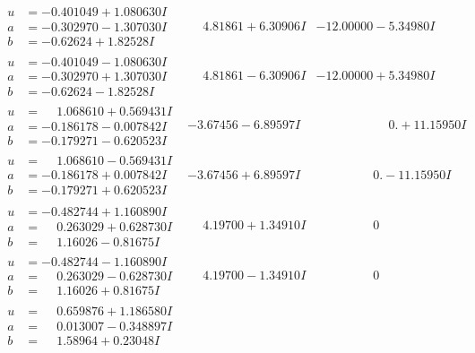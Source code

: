 \documentclass[1p]{elsarticle_modified}
\theoremstyle{definition}
\begin{document}
$$\begin{array}{c|c|c}
\begin{aligned}
u &= -0.401049 + 1.080630 I \\
a &= -0.302970 - 1.307030 I \\
b &= -0.62624 + 1.82528 I\end{aligned}
 & \phantom{-}4.81861 + 6.30906 I & -12.00000 - 5.34980 I \\ \hline\begin{aligned}
u &= -0.401049 - 1.080630 I \\
a &= -0.302970 + 1.307030 I \\
b &= -0.62624 - 1.82528 I\end{aligned}
 & \phantom{-}4.81861 - 6.30906 I & -12.00000 + 5.34980 I \\ \hline\begin{aligned}
u &= \phantom{-}1.068610 + 0.569431 I \\
a &= -0.186178 - 0.007842 I \\
b &= -0.179271 - 0.620523 I\end{aligned}
 & -3.67456 - 6.89597 I & \phantom{-0.000000 -}0. + 11.15950 I \\ \hline\begin{aligned}
u &= \phantom{-}1.068610 - 0.569431 I \\
a &= -0.186178 + 0.007842 I \\
b &= -0.179271 + 0.620523 I\end{aligned}
 & -3.67456 + 6.89597 I & \phantom{-0.000000 } 0. - 11.15950 I \\ \hline\begin{aligned}
u &= -0.482744 + 1.160890 I \\
a &= \phantom{-}0.263029 + 0.628730 I \\
b &= \phantom{-}1.16026 - 0.81675 I\end{aligned}
 & \phantom{-}4.19700 + 1.34910 I & \phantom{-0.000000 } 0 \\ \hline\begin{aligned}
u &= -0.482744 - 1.160890 I \\
a &= \phantom{-}0.263029 - 0.628730 I \\
b &= \phantom{-}1.16026 + 0.81675 I\end{aligned}
 & \phantom{-}4.19700 - 1.34910 I & \phantom{-0.000000 } 0 \\ \hline\begin{aligned}
u &= \phantom{-}0.659876 + 1.186580 I \\
a &= \phantom{-}0.013007 - 0.348897 I \\
b &= \phantom{-}1.58964 + 0.23048 I\end{aligned}

\end{array}$$
\end{document}
